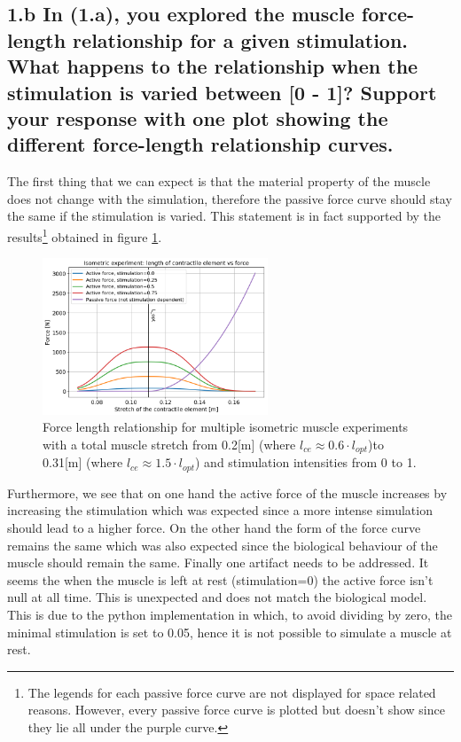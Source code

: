 \documentclass{cmc}
\begin{document}
\subsection*{1.b In (1.a), you explored the muscle force-length
  relationship for a given stimulation. What happens to the
  relationship when the stimulation is varied between [0 - 1]? Support
  your response with one plot showing the different force-length
  relationship curves.}

The first thing that we can expect is that the material property of the muscle does not change with the simulation, therefore the passive force curve should stay the same if the stimulation is varied. This statement is in fact supported by the results\footnote{The legends for each passive force curve are not displayed for space related reasons. However, every passive force curve is plotted but doesn't show since they lie all under the purple curve.} obtained in figure \ref{fig:Exercise1b}.
\begin{figure}[H]
    \centering
    \includegraphics[width=0.6\textwidth]{figures/1_b_lce_stimulation.png}
    \caption[Isometric experiment with multiple intensities]{Force length relationship for multiple isometric muscle experiments with a total muscle stretch from 0.2[m] (where $l_{ce}\approx0.6\cdot l_{opt}$)\footnotemark  to 0.31[m] (where $l_{ce}\approx1.5\cdot l_{opt}$) and stimulation intensities from 0 to 1.}
    \label{fig:Exercise1b}
\end{figure}

Furthermore, we see that on one hand the active force of the muscle increases by increasing the stimulation which was expected since a more intense simulation should lead to a higher force. On the other hand the form of the force curve remains the same which was also expected since the biological behaviour of the muscle should remain the same. Finally one artifact needs to be addressed. It seems the when the muscle is left at rest (stimulation=0) the active force isn't null at all time. This is unexpected and does not match the biological model. This is due to the python implementation in which, to avoid dividing by zero, the minimal stimulation is set to 0.05, hence it is not possible to simulate a muscle at rest.
\vfill
\clearpage
\end{document}
